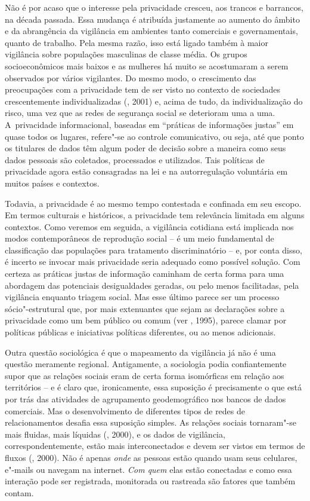 Não é por acaso que o interesse pela privacidade cresceu, aos trancos e
barrancos, na década passada. Essa mudança é atribuída justamente ao
aumento do âmbito e da abrangência da vigilância em ambientes tanto
comerciais e governamentais, quanto de trabalho. Pela mesma razão, isso
está ligado também à maior vigilância sobre populações masculinas de
classe média. Os grupos socioeconômicos mais baixos e as mulheres há
muito se acostumaram a serem observados por vários vigilantes. Do mesmo
modo, o crescimento das preocupações com a privacidade tem de ser visto
no contexto de sociedades crescentemente individualizadas (, 2001)
e, acima de tudo, da individualização do risco, uma vez que as redes de
segurança social se deterioram uma a uma. A~privacidade informacional,
baseadas em ``práticas de informações justas'' em quase todos os
lugares, refere"-se ao controle comunicativo, ou seja, até que ponto os
titulares de dados têm algum poder de decisão sobre a maneira como seus
dados pessoais são coletados, processados e utilizados. Tais políticas
de privacidade agora estão consagradas na lei e na autorregulação
voluntária em muitos países e contextos.

Todavia, a privacidade é ao mesmo tempo contestada e confinada em seu
escopo. Em termos culturais e históricos, a privacidade tem relevância
limitada em alguns contextos. Como veremos em seguida, a vigilância
cotidiana está implicada nos modos contemporâneos de reprodução social
-- é um meio fundamental de classificação das populações para
tratamento discriminatório -- e, por conta disso, é incerto se invocar
mais privacidade seria adequado como possível solução. Com certeza as
práticas justas de informação caminham de certa forma para uma abordagem
das potenciais desigualdades geradas, ou pelo menos facilitadas, pela
vigilância enquanto triagem social. Mas esse último parece ser um
processo sócio"-estrutural que, por mais extenuantes que sejam as
declarações sobre a privacidade como um bem público ou comum (ver ,
1995), parece clamar por políticas públicas e iniciativas políticas
diferentes, ou ao menos adicionais.

Outra questão sociológica é que o mapeamento da vigilância já não é uma
questão meramente regional. Antigamente, a sociologia podia
confiantemente supor que as relações sociais eram de certa forma
isomórficas em relação aos territórios -- e é claro que, ironicamente,
essa suposição é precisamente o que está por trás das atividades de
agrupamento geodemográfico nos bancos de dados comerciais. Mas o
desenvolvimento de diferentes tipos de redes de relacionamentos desafia
essa suposição simples. As relações sociais tornaram"-se mais fluidas,
mais líquidas (, 2000), e os dados de vigilância,
correspondentemente, estão mais interconectados e devem ser vistos em
termos de fluxos (, 2000). Não é apenas \emph{onde} as pessoas estão
quando usam seus celulares, e"-mails ou navegam na internet. \emph{Com
quem} elas estão conectadas e como essa interação pode ser registrada,
monitorada ou rastreada são fatores que também contam.

